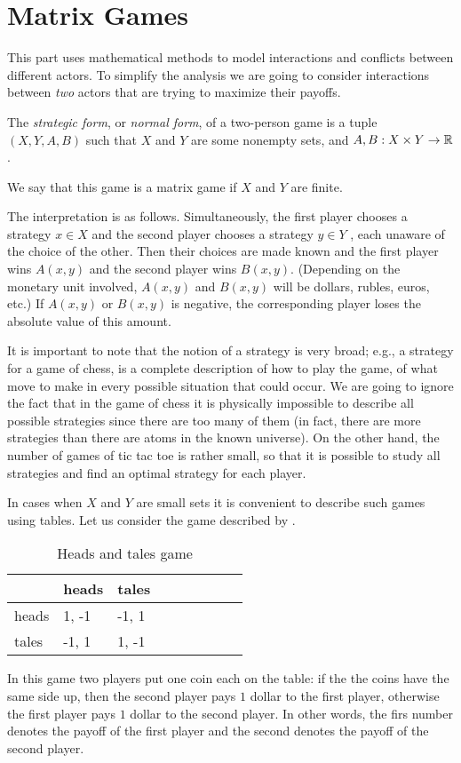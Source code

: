 \chapter{Matrix Games}
This part uses mathematical methods to model interactions and conflicts between
different actors. To simplify the analysis we are going to consider interactions
between \emph{two} actors that are trying to maximize their payoffs.

\begin{definition}
  The \emph{strategic form}, or \emph{normal form}, of a two-person game is
  a tuple $(X, Y, A, B)$ such that $X$ and $Y$ are some nonempty sets, and 
  $A, B  : X \times Y \to {\mathbb{R}}$.

  We say that this game is a matrix game if $X$ and $Y$ are finite.
\end{definition}
The interpretation is as follows. Simultaneously, the first player chooses 
a strategy $x \in X$ and the second player chooses a strategy $y \in Y$ , each
unaware of the choice of the other. Then their choices are made known and the
first player wins $A(x, y)$ and the second player wins $B(x, y)$. (Depending on
the monetary unit involved, $A(x, y)$ and $B(x, y)$ will be dollars, rubles,
euros, etc.) If $A(x, y)$ or $B(x, y)$ is negative, the corresponding player
loses the absolute value of this amount.

It is important to note that the notion of a strategy is very broad; e.g., a
strategy for a game of chess, is a complete description of how to play the game,
of what move to make in every possible situation that could occur. We are going
to ignore the fact that in the game of chess it is physically impossible to
describe all possible strategies since there are too many of them (in fact,
there are more strategies than there are atoms in the known universe). On the
other hand, the number of games of tic tac toe is rather small, so that it is
possible to study all strategies and find an optimal strategy for each player.

In cases when $X$ and $Y$ are small sets it is convenient to describe such games
using tables. Let us consider the game described by
.
\begin{table}
  \begin{center}
    \begin{tabular}{l l l  l  l  l  l  l  l}
      \toprule
            & heads  & tales   \\
      \midrule
      heads & 1, -1 & -1, 1   \\
      tales & -1, 1 & 1, -1   \\
      \bottomrule
    \end{tabular}
  \end{center}
  \caption{Heads and tales game}
  \label{table:heads-and-tales-game}
\end{table}
In this game two players put one coin each on the table: if the the coins have
the same side up, then the second player pays $1$ dollar to the first player,
otherwise the first player pays $1$ dollar to the second player. In other words,
the firs number denotes the payoff of the first player and the second denotes
the payoff of the second player.

